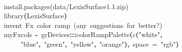 \documentclass[a4paper]{article}
\newcommand{\hlfunctioncall}[1]{\textcolor[rgb]{1,0,0}{#1}}%
\newcommand{\hlstring}[1]{\textcolor[rgb]{0.6,0.6,1}{#1}}%
\newcommand{\hlkeyword}[1]{\textcolor[rgb]{0,0,0}{\textbf{#1}}}%
\newcommand{\hlargument}[1]{\textcolor[rgb]{0.694117647058824,0.247058823529412,0.0196078431372549}{#1}}%
\newcommand{\hlcomment}[1]{\textcolor[rgb]{0.8,0.8,0.8}{#1}}%
\newcommand{\hlassignement}[1]{\textcolor[rgb]{0.215686274509804,0.215686274509804,0.384313725490196}{\textbf{#1}}}%
\newcommand{\hlpackage}[1]{\textcolor[rgb]{0.588235294117647,0.713725490196078,0.145098039215686}{#1}}%
\newcommand{\hlsymbol}[1]{\textcolor[rgb]{0,0,0}{#1}}%
\newcommand{\hlprompt}[1]{\textcolor[rgb]{0,0,0}{#1}}%
\newcommand{\hlstd}[1]{\textcolor[rgb]{0,0,0}{#1}}%
\newenvironment{Houtput}{\raggedright}{%
%
}
\begin{document}
\begin{Houtput}
\hspace*{\fill}\\
\hlstd{}\ttfamily\noindent
\hlprompt{\usebox{\hlnormalsizeboxgreaterthan}{\ }}\hlcomment{\usebox{\hlnormalsizeboxhash}install.packages(\usebox{\hlnormalsizeboxsinglequote}data/LexisSurface\usebox{\hlnormalsizeboxunderscore}1.1.zip\usebox{\hlnormalsizeboxsinglequote})}\mbox{}
\normalfont
\hspace*{\fill}\\
\hlstd{}\ttfamily\noindent
\hlprompt{\usebox{\hlnormalsizeboxgreaterthan}{\ }}\hlfunctioncall{library}\hlkeyword{(}\hlsymbol{LexisSurface}\hlkeyword{)}\mbox{}
\normalfont
\hspace*{\fill}\\
\hlstd{}\ttfamily\noindent
\hlprompt{\usebox{\hlnormalsizeboxgreaterthan}{\ }}\hlcomment{\usebox{\hlnormalsizeboxhash}{\ }invent{\ }Fx{\ }color{\ }ramp{\ }(any{\ }suggestions{\ }for{\ }better?)}\mbox{}
\normalfont
\hspace*{\fill}\\
\hlstd{}\ttfamily\noindent
\hlprompt{\usebox{\hlnormalsizeboxgreaterthan}{\ }}\hlsymbol{myFxcols}{\ }\hlassignement{\usebox{\hlnormalsizeboxlessthan}-}{\ }\hlpackage{grDevices}\hlkeyword{:::}\hlfunctioncall{colorRampPalette}\hlkeyword{(}\hlfunctioncall{c}\hlkeyword{(}\hlstring{"white"}\hlkeyword{,}\hspace*{\fill}\\
\hlstd{}\hlprompt{{\ }}{\ }{\ }{\ }{\ }\hlstring{"blue"}\hlkeyword{,}{\ }\hlstring{"green"}\hlkeyword{,}{\ }\hlstring{"yellow"}\hlkeyword{,}{\ }\hlstring{"orange"}\hlkeyword{)}\hlkeyword{,}{\ }\hlargument{space}{\ }\hlargument{=}{\ }\hlstring{"rgb"}\hlkeyword{)}\mbox{}
\normalfont
\hspace*{\fill}\\
\hlstd{}
\end{Houtput}
\end{document}
